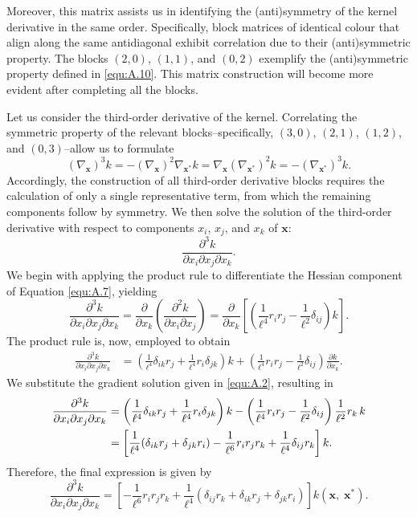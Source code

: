 Moreover, this matrix assists us in identifying the (anti)symmetry of the kernel derivative in the same order.
Specifically, block matrices of identical colour that align along the same antidiagonal exhibit correlation due to their (anti)symmetric property.
The blocks $(2,0)$, $(1,1)$, and $(0,2)$ exemplify the (anti)symmetric property defined in \eqref{equ:A.10}.
This matrix construction will become more evident after completing all the blocks.

Let us consider the third-order derivative of the kernel.
Correlating the symmetric property of the relevant blocks--specifically, $(3,0)$, $(2,1)$, $(1,2)$, and $(0,3)$--allow us to formulate
\begin{equation} \label{equ:A.11}
\boxed{
(\nabla_{\mathbf{x}})^{3} k=
-(\nabla_{\mathbf{x}})^{2} \nabla_{\mathbf{x}^*} k=
\nabla_{\mathbf{x}} (\nabla_{\mathbf{x}^*})^{2} k=
-(\nabla_{\mathbf{x}^*})^{3} k 
.
}
\end{equation}
Accordingly, the construction of all third-order derivative blocks requires the calculation of only a single representative term, from which the remaining components follow by symmetry.
We then solve the solution of the third-order derivative with respect to components $x_i$, $x_j$, and $x_k$ of $\mathbf{x}$:
\[
\frac{\partial^3 k}{\partial x_i \partial x_j \partial x_k}.
\]
We begin with applying the product rule to differentiate the Hessian component of Equation \eqref{equ:A.7}, yielding
\[
\frac{\partial^3 k}{\partial x_i \partial x_j \partial x_k}
= \frac{\partial}{\partial x_k} \left( \frac{\partial^2 k}{\partial x_i \partial x_j} \right)
= \frac{\partial}{\partial x_k} \left[ \left( \frac{1}{\ell^4} r_i r_j - \frac{1}{\ell^2} \delta_{ij} \right) k \right].
\]
The product rule is, now, employed to obtain
\begin{align} \label{equ:A.12}
\frac{\partial^3 k}{\partial x_i \partial x_j \partial x_k}
&= \left( \frac{1}{\ell^4} \delta_{ik} r_j + \frac{1}{\ell^4} r_i \delta_{jk} \right) k
+ \left( \frac{1}{\ell^4} r_i r_j - \frac{1}{\ell^2} \delta_{ij} \right) \frac{\partial k}{\partial x_k}.
\end{align}
We substitute the gradient solution given in \eqref{equ:A.2}, resulting in 
\begin{align} \label{equ:A.13}
\frac{\partial^3 k}{\partial x_i \partial x_j \partial x_k}
&= \left( \frac{1}{\ell^4} \delta_{ik} r_j + \frac{1}{\ell^4} r_i \delta_{jk} \right) k
- \left( \frac{1}{\ell^4} r_i r_j - \frac{1}{\ell^2} \delta_{ij} \right) \frac{1}{\ell^2} r_k \, k \notag \\
&= \left[ \frac{1}{\ell^4} (\delta_{ik} r_j + \delta_{jk} r_i) 
- \frac{1}{\ell^6} r_i r_j r_k + \frac{1}{\ell^4} \delta_{ij} r_k \right] k.
\end{align}
Therefore, the final expression is given by
\begin{equation} \label{equ:A.14}
\boxed{
\frac{\partial^3 k}{\partial x_i \partial x_j \partial x_k}
=
\left[
    -\frac{1}{\ell^6} r_i r_j r_k
    + \frac{1}{\ell^4} \left( \delta_{ij} r_k + \delta_{ik} r_j + \delta_{jk} r_i \right)
\right]
k(\mathbf{x},\;\mathbf{x}^*).
}
\end{equation}

